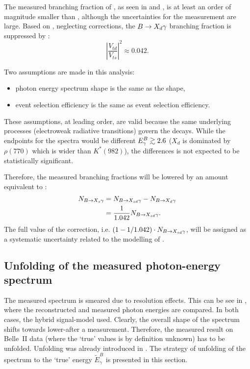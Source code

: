 The measured branching fraction of \BtoXdgamma, 
as seen in  and , is at least an order of magnitude smaller than \BtoXsgamma,
although the uncertainties for the measurement are large.
Based on , neglecting corrections, the $\BtoXdgamma$ branching fraction
is suppressed by \cite{Workman:2022ynf}:
\begin{equation}\label{eq:btodgamma_suppression}
    \left|\frac{V_{td}}{V_{ts}}\right|^2 \approx 0.042.
\end{equation}

Two assumptions are made in this analysis:
\begin{itemize}
    \item \BtoXdgamma photon energy spectrum shape is the same as the \BtoXsgamma shape,
    \item \BtoXdgamma event selection efficiency is the same as \BtoXsgamma event selection efficiency.
\end{itemize}
These assumptions, at leading order, are valid because the same underlying processes (electroweak radiative transitions) govern the decays.
While the endpoints for the spectra would be different ${E^B_{\gamma}}\gtrsim2.6$ ($X_d$ is dominated by $\rho(770)$ 
which is wider than $K^*(982)$), the differences is not expected to be statistically significant.

Therefore, the measured \BtoXsdgamma branching fractions will be lowered by an amount equivalent to :
\begin{align}\label{eq:btodgamma_subtraction}
    \begin{split}
    N_{\BtoXsgamma} &= N_{\BtoXsdgamma} - N_{\BtoXdgamma}\\
                    &=\frac{1}{1.042} N_{\BtoXsdgamma}.
    \end{split}
\end{align}
The full value of the correction, i.e. $(1-1/1.042) \cdot N_{\BtoXsdgamma}$, will be assigned as a systematic uncertainty related to the modelling of \BtoXdgamma.

\subsection{Unfolding of the measured photon-energy spectrum} \label{sec:signal_unfolding}

The measured \EB spectrum is smeared due to resolution effects.
This can be see in , where the reconstructed and measured photon energies are compared.
In both cases, the hybrid signal-model used.
Clearly, the overall shape of the spectrum shifts towards lower-\EB after a measurement.
Therefore, the measured result on Belle~II data (where the `true' values is by definition unknown) has to be unfolded.
Unfolding was already introduced in .
The strategy of unfolding of the \EB spectrum to the `true' energy $\tilde{E}_{\gamma}^B$ is presented in this section.

